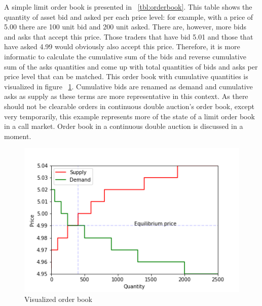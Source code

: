 A simple limit order book is presented in ~\ref{tbl:orderbook}. This table shows the
quantity of asset bid and asked per each price level: for example, with a price of 5.00
there are 100 unit bid and 200 unit asked. There are, however, more bids and asks that 
accept this price. Those traders that have bid 5.01 and those that have asked 4.99 would obviously also accept
this price. Therefore, it is more informatic to calculate the cumulative sum of the bids and reverse cumulative sum of 
the asks quantities and come up with total quantities of bids and asks per price level that can be matched.  
This order book with cumulative quantities is visualized in figure ~\ref{fig:lob_visual}. Cumulative bids
are renamed as demand and cumulative asks as supply as these terms are more representative in this context.
As there should not be clearable orders in continuous double auction's order book, except very temporarily, 
this example represents more of the state of a limit order book in a call market. Order book
in a continuous double auction is discussed in a moment.

\begin{figure}[H]
    \begin{center}  
        \includegraphics{plots/orderbook_visualized.png}
        \caption{Visualized order book}
        \label{fig:lob_visual}
    \end{center}
\end{figure}

